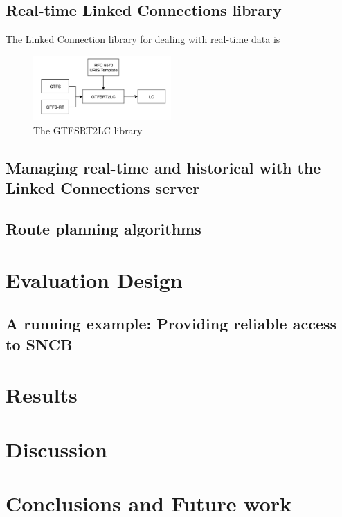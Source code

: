 \documentclass[sw]{iosart2x}
\begin{document}
\subsection{Real-time Linked Connections library}
The Linked Connection library for dealing with real-time data is 
\begin{figure}[t]
	\includegraphics[width=0.47\textwidth]{images/gtfsrt2lc.png}
	\caption{The GTFSRT2LC library}\label{fig:gtfsrt2lc}
\end{figure}



\subsection{Managing real-time and historical with the Linked Connections server}



\subsection{Route planning algorithms}

\section{Evaluation Design}
\subsection{A running example: Providing reliable access to SNCB}

\section{Results}

\section{Discussion}

\section{Conclusions and Future work}
\end{document}
